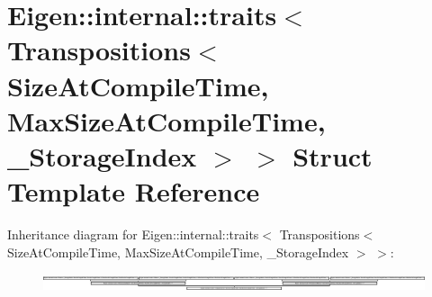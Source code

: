 \hypertarget{struct_eigen_1_1internal_1_1traits_3_01_transpositions_3_01_size_at_compile_time_00_01_max_size_a3e3a58d21bfa7053a385355887ee81d}{}\section{Eigen\+:\+:internal\+:\+:traits$<$ Transpositions$<$ Size\+At\+Compile\+Time, Max\+Size\+At\+Compile\+Time, \+\_\+\+Storage\+Index $>$ $>$ Struct Template Reference}
\label{struct_eigen_1_1internal_1_1traits_3_01_transpositions_3_01_size_at_compile_time_00_01_max_size_a3e3a58d21bfa7053a385355887ee81d}
Inheritance diagram for Eigen\+:\+:internal\+:\+:traits$<$ Transpositions$<$ Size\+At\+Compile\+Time, Max\+Size\+At\+Compile\+Time, \+\_\+\+Storage\+Index $>$ $>$\+:\begin{figure}[H]
\begin{center}
\leavevmode
\includegraphics[height=0.509091cm]{struct_eigen_1_1internal_1_1traits_3_01_transpositions_3_01_size_at_compile_time_00_01_max_size_a3e3a58d21bfa7053a385355887ee81d}
\end{center}
\end{figure}
